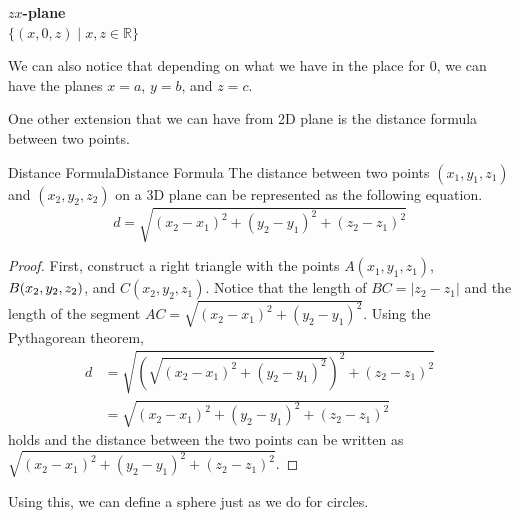 \documentclass[../../main.tex]{subfiles}
\begin{document}
\hfill
\begin{minipage}{0.3\textwidth}
\begin{center}
\textbf{$zx$-plane} \\
$\{ (x, 0, z) \mid x, z \in \mathbb{R} \}$
\end{center}
\begin{figure}[H]
\centering
{}
\end{figure}
\end{minipage}

We can also notice that depending on what we have in the place
for $0$, we can have the planes $x = a$, $y = b$, and $z = c$.

One other extension that we can have from 2D plane is the distance
formula between two points.

\begin{theorem}{Distance Formula}{Distance Formula}
The distance between two points $(x_1, y_1, z_1)$ and
$(x_2, y_2, z_2)$ on a 3D plane can be represented as the following
equation.
\[
d
= \sqrt{ (x_2 - x_1)^2 + (y_2 - y_1)^2 + (z_2 - z_1)^2 }
\]
\end{theorem}
\begin{proof}
First, construct a right triangle with the points $A(x_1, y_1, z_1)$,
$B(x_2, y_2, \linebreak z_2)$, and $C(x_2, y_2, z_1)$. Notice that
the length of $BC = |z_2 - z_1|$ and the length of the segment $AC =
\sqrt{(x_2 - x_1)^2 + (y_2 - y_1)^2}$. Using the Pythagorean theorem,
\begin{align*}
    d
    &= \sqrt{
        \left( \sqrt{(x_2 - x_1)^2 + (y_2 - y_1)^2} \right)^2
            + (z_2 - z_1)^2
    } \\
    &= \sqrt{ (x_2 - x_1)^2 + (y_2 - y_1)^2 + (z_2 - z_1)^2 }
\end{align*}
holds and the distance between the two points can be written as
$\sqrt{ (x_2 - x_1)^2 + (y_2 - y_1)^2 + (z_2 - z_1)^2 }$.
\end{proof}

Using this, we can define a sphere just as we do for circles.
\end{document}
